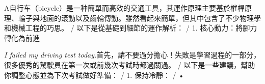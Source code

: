 \begin{multicols}{2}
A自\allowbreak{}行\allowbreak{}车\allowbreak{}（\allowbreak{}bicyc\allowbreak{}le）\allowbreak{}是\allowbreak{}一\allowbreak{}种\allowbreak{}簡\allowbreak{}單\allowbreak{}而\allowbreak{}高\allowbreak{}\allowbreak{}效\allowbreak{}的\allowbreak{}交\allowbreak{}通\allowbreak{}工\allowbreak{}具\allowbreak{}，\allowbreak{}其\allowbreak{}運\allowbreak{}作\allowbreak{}\allowbreak{}原\allowbreak{}理\allowbreak{}主\allowbreak{}要\allowbreak{}基\allowbreak{}於\allowbreak{}槯\allowbreak{}桿\allowbreak{}原\allowbreak{}理\allowbreak{}\allowbreak{}、\allowbreak{}輪\allowbreak{}子\allowbreak{}與\allowbreak{}地\allowbreak{}面\allowbreak{}的\allowbreak{}滾\allowbreak{}動\allowbreak{}以\allowbreak{}\allowbreak{}及\allowbreak{}齒\allowbreak{}輪\allowbreak{}傳\allowbreak{}動\allowbreak{}。\allowbreak{}雖\allowbreak{}然\allowbreak{}看\allowbreak{}起\allowbreak{}\allowbreak{}來\allowbreak{}簡\allowbreak{}單\allowbreak{}，\allowbreak{}但\allowbreak{}其\allowbreak{}中\allowbreak{}包\allowbreak{}含\allowbreak{}了\allowbreak{}\allowbreak{}不\allowbreak{}少\allowbreak{}物\allowbreak{}理\allowbreak{}學\allowbreak{}和\allowbreak{}機\allowbreak{}械\allowbreak{}工\allowbreak{}程\allowbreak{}\allowbreak{}的\allowbreak{}巧\allowbreak{}思\allowbreak{}。\allowbreak{} / 以\allowbreak{}下\allowbreak{}是\allowbreak{}從\allowbreak{}基\allowbreak{}礎\allowbreak{}到\allowbreak{}細\allowbreak{}節\allowbreak{}的\allowbreak{}運\allowbreak{}作\allowbreak{}解\allowbreak{}析\allowbreak{}：\allowbreak{} / 1. 核\allowbreak{}心\allowbreak{}動\allowbreak{}力\allowbreak{}：\allowbreak{}將\allowbreak{}腳\allowbreak{}力\allowbreak{}轉\allowbreak{}化\allowbreak{}為\allowbreak{}前\allowbreak{}進\allowbreak{}\par\noindent\textit{I failed my driving test today.}\enspace 首\allowbreak{}先\allowbreak{}，\allowbreak{}請\allowbreak{}不\allowbreak{}要\allowbreak{}過\allowbreak{}分\allowbreak{}擔\allowbreak{}心\allowbreak{}\allowbreak{}！\allowbreak{}失\allowbreak{}敗\allowbreak{}是\allowbreak{}學\allowbreak{}習\allowbreak{}過\allowbreak{}程\allowbreak{}的\allowbreak{}一\allowbreak{}\allowbreak{}部\allowbreak{}分\allowbreak{}，\allowbreak{}很\allowbreak{}多\allowbreak{}優\allowbreak{}秀\allowbreak{}的\allowbreak{}駕\allowbreak{}駛\allowbreak{}\allowbreak{}員\allowbreak{}在\allowbreak{}第\allowbreak{}一\allowbreak{}次\allowbreak{}或\allowbreak{}前\allowbreak{}幾\allowbreak{}次\allowbreak{}考\allowbreak{}\allowbreak{}試\allowbreak{}時\allowbreak{}都\allowbreak{}過\allowbreak{}關\allowbreak{}過\allowbreak{}。\allowbreak{} / 以\allowbreak{}下\allowbreak{}是\allowbreak{}一\allowbreak{}些\allowbreak{}建\allowbreak{}議\allowbreak{}，\allowbreak{}幫\allowbreak{}助\allowbreak{}\allowbreak{}你\allowbreak{}調\allowbreak{}整\allowbreak{}心\allowbreak{}態\allowbreak{}並\allowbreak{}為\allowbreak{}下\allowbreak{}次\allowbreak{}考\allowbreak{}\allowbreak{}試\allowbreak{}做\allowbreak{}好\allowbreak{}準\allowbreak{}備\allowbreak{}：\allowbreak{} / 1. 保\allowbreak{}持\allowbreak{}冷\allowbreak{}靜\allowbreak{}：\allowbreak{} / • 
\end{multicols}

